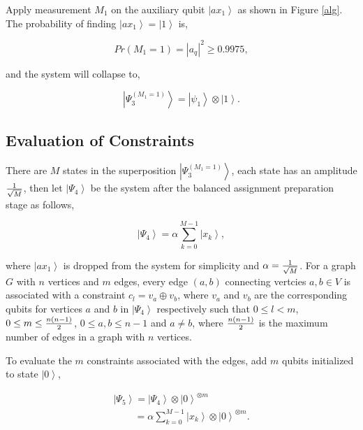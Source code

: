 \documentclass[a4paper]{article}
\begin{document}
Apply measurement $M_1$ on the auxiliary qubit $\left| {ax_1 } \right\rangle$ as shown in Figure \ref{alg}. 
The probability of finding $\left| {ax_1 } \right\rangle=\left| {1} \right\rangle$ is,

\begin{equation}
Pr{(M_1  = 1)}  = \left| {a_q } \right|^2  \ge 0.9975,
\end{equation}

\noindent
and the system will collapse to, 
 
\begin{equation}
\left|\Psi_3^{(M_1  = 1)}\right\rangle = \left| {\psi _1 } \right\rangle \otimes \left| {1 } \right\rangle. 
\end{equation}







 \subsection{Evaluation of Constraints}
 
There are $M$ states in the superposition $\left|\Psi_3^{(M_1  = 1)}\right\rangle$, each state has an amplitude 
${\textstyle{1 \over {\sqrt M }}}$, then let $\left|\Psi_4\right\rangle$ be the system after 
the balanced assignment preparation stage as follows, 

\begin{equation}
\left|\Psi_4\right\rangle = \alpha \sum\limits_{k = 0}^{M - 1} {\left| x_k \right\rangle},
\end{equation}

\noindent
where $\left|ax_1\right\rangle$ is dropped from the system for simplicity and $\alpha = {\textstyle{1 \over {\sqrt M }}}$. 
For a graph $G$ with $n$ vertices and $m$ edges, every edge $(a, b )$ connecting vertcies $a,b \in V$ 
is associated with a constraint $c_l=v_a\oplus v_b$, where $v_a$ and $v_b$ are the corresponding qubits for vertices $a$ and $b$ 
in $\left|\Psi_4\right\rangle$ respectively such that 
$0 \le l < m$, $0 \le m \le {\textstyle{{n(n - 1)} \over 2}}$, $0 \le a,b \le n-1$ and $a \ne b$, where 
${\textstyle{{n(n - 1)} \over 2}}$ is the maximum number of edges in a graph with $n$ vertices.

To evaluate the $m$ constraints associated with the edges, add $m$ qubits initialized 
to state $\left|0\right\rangle$,   

\begin{equation}
\begin{array}{l}
\left|\Psi_5\right\rangle = \left|\Psi_4\right\rangle \otimes \left|0\right\rangle^{\otimes m}\\
\,\,\,\,\,\,\,\,\,\,\,\,\,=\alpha \sum\limits_{k = 0}^{M - 1} { {\left| x_k \right\rangle \otimes \left|0 \right\rangle^{\otimes m} } }.\\
\end{array}
\end{equation}
\end{document}
